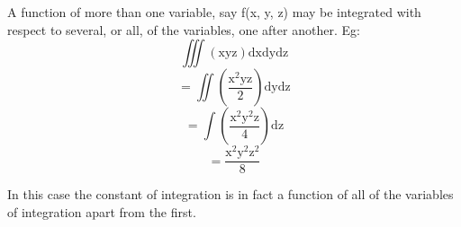 A function of more than one variable, say f(x, y, z) may be integrated with respect
to several, or all, of the variables, one after another. Eg:
\[ \iiint ( \mathrm{xyz} ) \mathrm{dxdydz} \]
\[ = \iint ( \frac{\mathrm{x}^2 \mathrm{yz}}{2} ) \mathrm{dydz} \]
\[ = \int ( \frac{\mathrm{x}^2 \mathrm{y} ^2 \mathrm{z}}{4} ) \mathrm{dz} \]
\[ = \frac{\mathrm{x}^2 \mathrm{y}^2 \mathrm{z}^2}{8} \]
\par
In this case the constant of integration is in fact a function of all of the
variables of integration apart from the first.